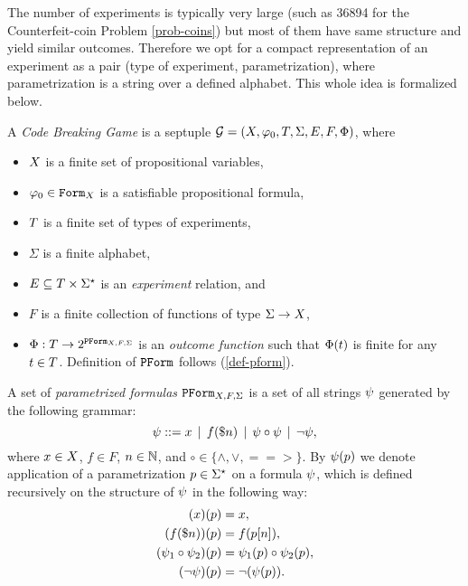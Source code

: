 The number of experiments is typically very large
  (such as 36894 for the Counterfeit-coin Problem \ref{prob-coins})
  but most of them have same structure and yield similar outcomes.
Therefore we opt for a compact representation of an experiment as a pair
  (type of experiment, parametrization), where parametrization is a string
  over a defined alphabet.
This whole idea is formalized below.

\begin{definition} \label{def-game}
A \emph{Code Breaking Game} is a septuple
  $\mathcal{G} = (X, \varphi_0, T, \Sigma, E, F, \Phi)$, where
  \begin{itemize}
  \item $X$ is a finite set of propositional variables,
  \item $\varphi_0 \in \mathtt{Form}_X$ is a satisfiable propositional formula,
  \item $T$ is a finite set of types of experiments,
  \item $\Sigma$ is a finite alphabet,
  \item $E \subseteq T \times \Sigma^\star$
    is an \emph{experiment} relation, and
  \item $F$ is a finite collection of functions of type $\Sigma -> X$,
  \item $\Phi: T -> 2^{\mathtt{PForm}_{X,F,\Sigma}}$ is an
  \emph{outcome function} such that $\Phi(t)$ is finite
  for any $t\in T$. Definition of $\mathtt{PForm}$ follows
   (\autoref{def-pform}).
  \end{itemize}
\end{definition}

\begin{definition} \label{def-pform}
A set of \emph{parametrized formulas} $\mathtt{PForm}_{X,F,\Sigma}$ is a set of
  all strings $\psi$ generated by the following grammar:
  $$ \psi ::= x \:\:|\:\: f(\$n) \:\:|\:\: \psi \circ \psi \:\:|\:\: \neg \psi,$$
  where $x\in X$, $f\in F$, $n \in\mathbb{N}$,
  and $\circ\in\{\wedge, \vee, ==>\}$.
By $\psi(p)$ we denote application of
  a parametrization $p\in\Sigma^\star$
  on a formula $\psi$,
  which is defined recursively on the structure of $\psi$
  in the following way:
\begin{align}
(x)(p) &= x, \\
(f(\$n))(p) &= f(p[n]),\\
(\psi_1\circ\psi_2)(p) &= \psi_1(p) \circ \psi_2(p),\\
(\neg\psi)(p) &= \neg(\psi(p)).
\end{align}
\end{definition}

